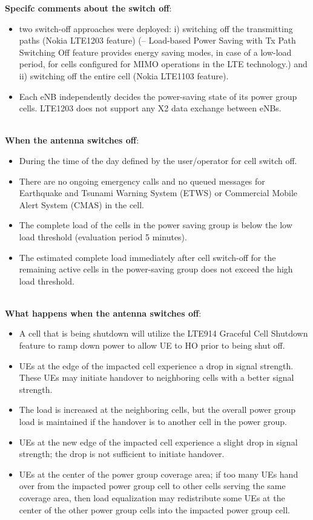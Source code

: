 \textbf{Specifc comments about the switch off}:
\begin{itemize}
    \item two switch-off approaches were deployed: i) switching off the transmitting paths (Nokia LTE1203 feature) (– Load-based Power Saving with Tx Path Switching Off feature provides energy saving modes, in case of a low-load period, for cells configured for MIMO operations in the LTE technology.) and ii) switching off the entire cell (Nokia LTE1103 feature).
    \item Each eNB independently decides the power-saving state of its power group cells. LTE1203 does not support any X2 data exchange between eNBs.
\end{itemize}
\\

\textbf{When the antenna switches off}:
\begin{itemize}
    \item During the time of the day defined by the user/operator for cell switch off.
    \item There are no ongoing emergency calls and no queued messages for Earthquake and Tsunami Warning System (ETWS) or Commercial Mobile Alert System (CMAS) in the cell.
    \item The complete load of the cells in the power saving group is below the low load threshold (evaluation period 5 minutes).
    \item The estimated complete load immediately after cell switch-off for the remaining active cells in the power-saving group does not exceed the high load threshold.
\end{itemize}
\\

\textbf{What happens when the antenna switches off}:
\begin{itemize}
    \item A cell that is being shutdown will utilize the LTE914 Graceful Cell Shutdown feature to ramp down power to allow UE to HO prior to being shut off.
    \item UEs at the edge of the impacted cell experience a drop in signal strength. These UEs may initiate handover to neighboring cells with a better signal strength. 
    \item The load is increased at the neighboring cells, but the overall power group load is maintained if the handover is to another cell in the power group.
    \item UEs at the new edge of the impacted cell experience a slight drop in signal strength; the drop is not sufficient to initiate handover.
    \item UEs at the center of the power group coverage area; if too many UEs hand over from the impacted power group cell to other cells serving the same coverage area, then load equalization may redistribute some UEs at the center of the other power group cells into the impacted power group cell.
\end{itemize}


